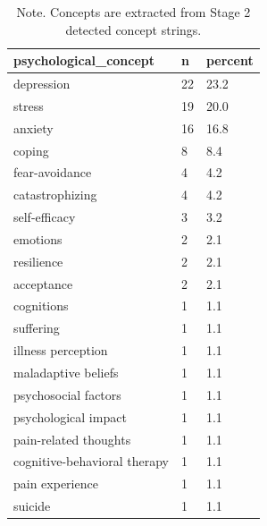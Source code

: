 \begin{table}[htbp]
\raggedright
\caption{Primary Research Question 3. Most frequent psychological concepts.}
\label{tab.psych.concepts}
\begin{tabular}{lll}
\toprule
psychological\_concept & n & percent \\
\midrule
depression & 22 & 23.2 \\
stress & 19 & 20.0 \\
anxiety & 16 & 16.8 \\
coping & 8 & 8.4 \\
fear-avoidance & 4 & 4.2 \\
catastrophizing & 4 & 4.2 \\
self-efficacy & 3 & 3.2 \\
emotions & 2 & 2.1 \\
resilience & 2 & 2.1 \\
acceptance & 2 & 2.1 \\
cognitions & 1 & 1.1 \\
suffering & 1 & 1.1 \\
illness perception & 1 & 1.1 \\
maladaptive beliefs & 1 & 1.1 \\
psychosocial factors & 1 & 1.1 \\
psychological impact & 1 & 1.1 \\
pain-related thoughts & 1 & 1.1 \\
cognitive-behavioral therapy & 1 & 1.1 \\
pain experience & 1 & 1.1 \\
suicide & 1 & 1.1 \\
\bottomrule
\end{tabular}

\caption*{Note. Concepts are extracted from Stage 2 detected concept strings.}
\end{table}
